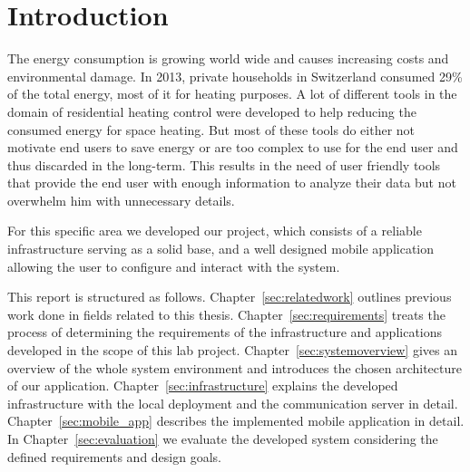 
\chapter{Introduction}
\label{sec:introduction}



The energy consumption is growing world wide and causes increasing costs and environmental damage.
In 2013, private households in Switzerland consumed 29\% of the total energy\cite{schweizerischeGesamtenergiestatistik2013}, most of it for heating purposes\cite{analyseEnergieverbrauchVerwendungszwecke2013}.
A lot of different tools in the domain of residential heating control were developed to help reducing the consumed energy for space heating.
But most of these tools do either not motivate end users to save energy or are too complex to use for the end user and thus discarded in the long-term.
This results in the need of user friendly tools that provide the end user with enough information to analyze their data but not overwhelm him with unnecessary details.


For this specific area we developed our project, which consists of a reliable infrastructure serving as a solid base, and a well designed mobile application allowing the user to configure and interact with the system.

This report is structured as follows.
Chapter~\ref{sec:relatedwork} outlines previous work done in fields related to this thesis.
Chapter~\ref{sec:requirements} treats the process of determining the requirements of the infrastructure and applications developed in the scope of this lab project.
Chapter~\ref{sec:systemoverview} gives an overview of the whole system environment and introduces the chosen architecture of our application.
Chapter~\ref{sec:infrastructure} explains the developed infrastructure with the local deployment and the communication server in detail.
Chapter~\ref{sec:mobile_app} describes the implemented mobile application in detail.
In Chapter~\ref{sec:evaluation} we evaluate the developed system considering the defined requirements and design goals.



